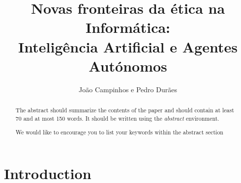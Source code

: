 \documentclass[runningheads,a4paper]{llncs}
\newcommand{\keywords}[1]{\par\addvspace\baselineskip
\noindent\keywordname\enspace\ignorespaces#1}
\begin{document}
\mainmatter%

\title{Novas fronteiras da ética na Informática:\\Inteligência Artificial e Agentes Autónomos}


%
%
\author{João Campinhos e Pedro Durães}
%


%
%

\maketitle


\begin{abstract}
The abstract should summarize the contents of the paper and should
contain at least 70 and at most 150 words. It should be written using the
\emph{abstract} environment.
\keywords{We would like to encourage you to list your keywords within
the abstract section}
\end{abstract}


\section{Introduction}
\end{document}
